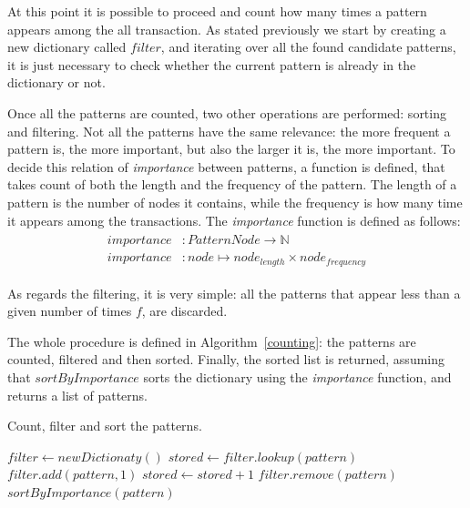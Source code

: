 \documentclass{acm_proc_article-sp-sigmod09}
\begin{document}
At this point it is possible to proceed and count how many times a pattern appears among the all transaction. As stated previously we start by creating a new dictionary called $filter$, and iterating over all the found candidate patterns, it is just necessary to check whether the current pattern is already in the dictionary or not.

Once all the patterns are counted, two other operations are performed: sorting and filtering. Not all the patterns have the same relevance: the more frequent a pattern is, the more important, but also the larger it is, the more important. To decide this relation of \emph{importance} between patterns, a function is defined, that takes count of both the length and the frequency of the pattern. The length of a pattern is the number of nodes it contains, while the frequency is how many time it appears among the transactions. The \emph{importance} function is defined as follows:
\begin{gather}
\begin{split}
importance & \colon PatternNode \to \mathbb{N} \\
importance & \colon node \mapsto node_{length} \times node_{frequency}
\end{split}
\end{gather}

As regards the filtering, it is very simple: all the patterns that appear less than a given number of times $f$, are discarded.

The whole procedure is defined in Algorithm~\ref{counting}: the patterns are counted, filtered and then sorted. Finally, the sorted list is returned, assuming that $sortByImportance$ sorts the dictionary using the \emph{importance} function, and returns a list of patterns.

\begin{algorithm}
\caption{Count, filter and sort the patterns.}
\label{counting}
\begin{algorithmic}[1]
\State $filter \gets new Dictionaty()$
	\State $stored \gets filter.lookup(pattern)$
		\State $filter.add(pattern, 1)$
	\Else
		\State $stored \gets stored + 1$
	\EndIf
\EndFor
{}
		\State $filter.remove(pattern)$
	\EndIf
\EndFor
\Return $sortByImportance(pattern)$
\EndFunction
\end{algorithmic}
\end{algorithm}
\end{document}
